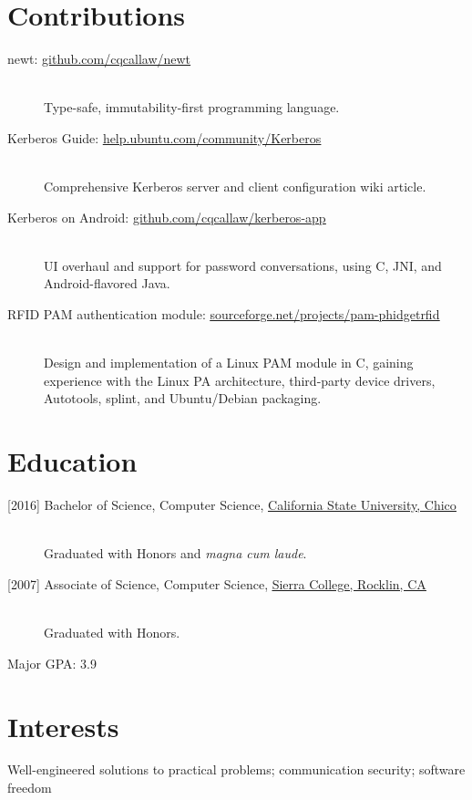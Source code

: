 \documentclass{article}
\begin{document}
	\section*{Contributions}
	\begin{description}
		\item[newt: \href{https://github.com/cqcallaw/newt}{\ul{github.com/cqcallaw/newt}}] \hfill \\
		Type-safe, immutability-first programming language.
		\item[Kerberos Guide: \href{https://help.ubuntu.com/community/Kerberos}{\ul{help.ubuntu.com/community/Kerberos}}] \hfill \\
		Comprehensive Kerberos server and client configuration wiki article.
		\item[Kerberos on Android: \href{https://github.com/cqcallaw/kerberos-app/}{\ul{github.com/cqcallaw/kerberos-app}}] \hfill \\
		UI overhaul and support for password conversations, using C, JNI, and Android-flavored Java.
		\item[RFID PAM authentication module: \href{http://sourceforge.net/projects/pam-phidgetrfid/}{\ul{sourceforge.net/projects/pam-phidgetrfid}}] \hfill \\
		Design and implementation of a Linux PAM module in C, gaining experience with the Linux PA architecture, third-party device drivers, Autotools, splint, and Ubuntu/Debian packaging.
	\end{description}

	\section*{Education}
	\begin{description}
		\item[{[}2016{]} Bachelor of Science, Computer Science, \href{http://www.csuchico.edu/}{\ul{California State University, Chico}}] \hfill \\
		Graduated with Honors and {\em magna cum laude}.
		\item[{[}2007{]} Associate of Science, Computer Science, \href{http://www.sierracollege.edu/}{\ul{Sierra College, Rocklin, CA}}] \hfill \\
		Graduated with Honors.
	\end{description}
	Major GPA: 3.9

	\section*{Interests}
	Well-engineered solutions to practical problems; communication security; software freedom
\end{document}

